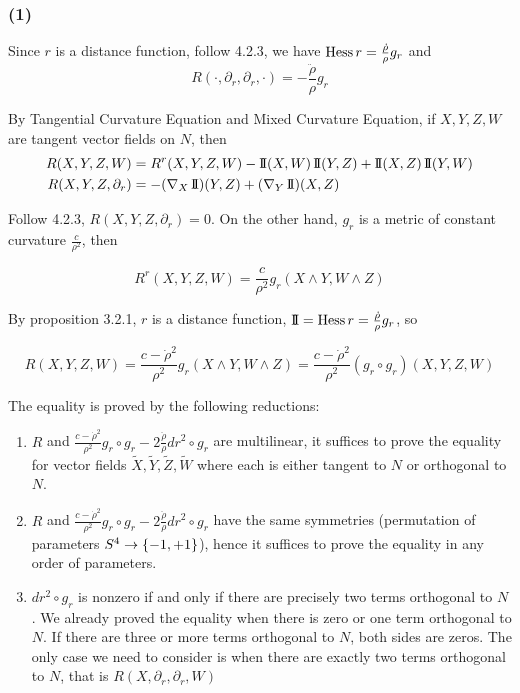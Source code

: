 \subsubsection{(1)}

Since $r$ is a distance function, follow 4.2.3, we have $\operatorname{Hess} r = \frac{\dot{\rho}}{\rho} g_r$ and 
$$
	R(\cdot, \partial_r, \partial_r, \cdot) = - \frac{\ddot{\rho}}{\rho} g_r
$$

By Tangential Curvature Equation and Mixed Curvature Equation, if $X, Y, Z, W$ are tangent vector fields on $N$, then
\begin{align*}
	R(X, Y, Z, W) &= R^r(X, Y, Z, W) - \operatorname{\mathrm{I\!I}}(X, W) \operatorname{\mathrm{I\!I}}(Y, Z) + \operatorname{\mathrm{I\!I}}(X, Z) \operatorname{\mathrm{I\!I}}(Y, W) \\
	R(X, Y, Z, \partial_r) &= - (\nabla_X \operatorname{\mathrm{I\!I}})(Y, Z) + (\nabla_Y \operatorname{\mathrm{I\!I}})(X, Z)
\end{align*}

Follow 4.2.3,  $R(X, Y, Z, \partial_r) = 0$. On the other hand, $g_r$ is a metric of constant curvature $\frac{c}{\rho^2}$, then

$$
	R^r(X, Y, Z, W) = \frac{c}{\rho^2} g_r(X \wedge Y, W \wedge Z)
$$

By proposition 3.2.1, $r$ is a distance function, $\operatorname{\mathrm{I\!I}} = \operatorname{Hess} r = \frac{\dot{\rho}}{\rho} g_r$, so

$$
	R(X, Y, Z, W) = \frac{c - \dot{\rho}^2}{\rho^2} g_r(X \wedge Y, W \wedge Z) = \frac{c - \dot{\rho}^2}{\rho^2} (g_r \circ g_r)(X, Y, Z, W)
$$

The equality is proved by the following reductions:

\begin{enumerate}
	\item $R$ and $\frac{c - \dot{\rho}^2}{\rho^2} g_r \circ g_r - 2 \frac{\ddot{\rho}}{\rho} dr^2 \circ g_r$ are multilinear, it suffices to prove the equality for vector fields $\tilde{X}, \tilde{Y}, \tilde{Z}, \tilde{W}$ where each is either tangent to $N$ or orthogonal to $N$.
	\item $R$ and $\frac{c - \dot{\rho}^2}{\rho^2} g_r \circ g_r - 2 \frac{\ddot{\rho}}{\rho} dr^2 \circ g_r$ have the same symmetries (permutation of parameters $S^4 \to \{-1, +1\}$), hence it suffices to prove the equality in any order of parameters.
	\item $dr^2 \circ g_r$ is nonzero if and only if there are precisely two terms orthogonal to $N$. We already proved the equality when there is zero or one term orthogonal to $N$. If there are three or more terms orthogonal to $N$, both sides are zeros. The only case we need to consider is when there are exactly two terms orthogonal to $N$, that is $R(X, \partial_r, \partial_r, W)$
\end{enumerate}

